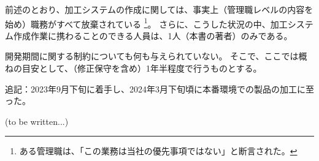 




前述のとおり、加工システムの作成に関しては、事実上（管理職レベルの内容を始め）職務がすべて放棄されている
\footnote{ある管理職は、「この業務は当社の優先事項ではない」と断言された。}。
さらに、こうした状況の中、加工システム作成作業に携わることのできる人員は、1人（本書の著者）のみである。



開発期間に関する制約についても何も与えられていない。
そこで、ここでは概ねの目安として、（修正保守を含め）1年半程度で行うものとする。
\begin{marker}
追記：2023年9月下旬に着手し、2024年3月下旬頃に本番環境での製品の加工に至った。
\end{marker}



(to be written...)


